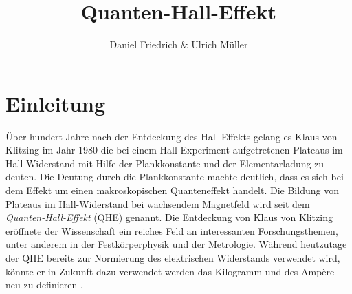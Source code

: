 \documentclass[paper=a4,fontsize=10pt,DIV=18,twocolumn,parskip=half]{scrartcl}
\numberwithin{equation}{section}    %
\begin{document}
\title{Quanten-Hall-Effekt}                  
\author{Daniel Friedrich \& Ulrich Müller}         
\date{}                                %
%
\section{Einleitung}
\label{Einleitung}
Über hundert Jahre nach der Entdeckung des Hall-Effekts gelang es Klaus von Klitzing im Jahr 1980 die bei einem Hall-Experiment aufgetretenen Plateaus im Hall-Widerstand mit Hilfe der Plankkonstante und der Elementarladung zu deuten. Die Deutung durch die Plankkonstante machte deutlich, dass es sich bei dem Effekt um einen makroskopischen Quanteneffekt handelt. Die Bildung von Plateaus im Hall-Widerstand bei wachsendem Magnetfeld wird seit dem \emph{Quanten-Hall-Effekt} (QHE) genannt. Die Entdeckung von Klaus von Klitzing eröffnete der Wissenschaft ein reiches Feld an interessanten Forschungsthemen, unter anderem in der Festkörperphysik und der Metrologie. Während heutzutage der QHE bereits zur Normierung des elektrischen Widerstands verwendet wird, könnte er in Zukunft dazu verwendet werden das Kilogramm und des Ampère neu zu definieren \cite{janssen}. 
\end{document}
